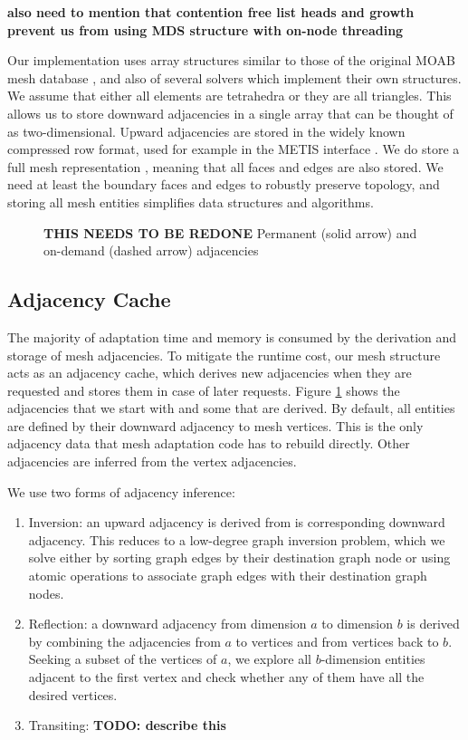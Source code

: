 {\bf also need to mention that contention free list
heads and growth prevent us from using MDS structure
with on-node threading}

Our implementation uses array structures similar to those
of the original MOAB mesh database \cite{tautges2004moab},
and also of several solvers which implement their own structures.
We assume that either all elements are tetrahedra or they are all triangles.
This allows us to store downward adjacencies in a single array
that can be thought of as two-dimensional.
Upward adjacencies are stored in the widely known compressed row format,
used for example in the METIS interface \cite{METIS}.
We do store a full mesh representation \cite{beall1997general}, meaning
that all faces and edges are also stored.
We need at least the boundary faces and edges to robustly preserve
topology, and storing all mesh entities simplifies data structures
and algorithms.

\begin{figure}[t]\vspace*{4pt}
\caption{{\bf THIS NEEDS TO BE REDONE} Permanent (solid arrow) and on-demand (dashed arrow) adjacencies}\vspace*{-6pt}
\label{fig:adjs}
\end{figure}

\subsection{Adjacency Cache}

The majority of adaptation time and memory is consumed by the
derivation and storage of mesh adjacencies.
To mitigate the runtime cost, our mesh structure acts as an adjacency cache,
which derives new adjacencies when they are requested and stores
them in case of later requests.
Figure \ref{fig:adjs} shows the adjacencies that we start with and some
that are derived.
By default, all entities are defined by their downward adjacency to mesh vertices.
This is the only adjacency data that mesh adaptation code has to rebuild
directly.
Other adjacencies are inferred from the vertex adjacencies.

We use two forms of adjacency inference:
\begin{enumerate}
\item Inversion: an upward adjacency is derived from is corresponding downward
adjacency. This reduces to a low-degree graph inversion problem, which we
solve either by sorting graph edges by their destination graph node or using
atomic operations to associate graph edges with their destination graph nodes.
\item Reflection: a downward adjacency from dimension $a$ to dimension $b$
is derived by combining the adjacencies from $a$ to vertices and from
vertices back to $b$.
Seeking a subset of the vertices of $a$, we explore all $b$-dimension entities
adjacent to the first vertex and check whether any of them have all the
desired vertices.
\item Transiting: {\bf TODO: describe this}
\end{enumerate}

